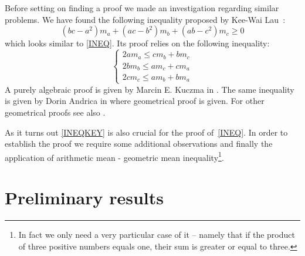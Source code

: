 \documentclass[a4paper,12pt]{article}
\begin{document}
Before setting on finding a proof we made an investigation regarding similar problems. We have found the following inequality proposed by Kee-Wai Lau~\cite{Crux}:
\begin{equation}\label{INEQS}
\left({bc}-a^2\right) m_a+ \left({ac}-b^2\right)m_b+\left({ab}-c^2\right)m_c \geq 0
\end{equation}
which looks similar to \eqref{INEQ}. Its proof relies on the following inequality:
\begin{equation}\label{INEQKEY}
\begin{cases}
2a m_a \leq c m_b+b m_c\\
2b m_b \leq a m_c+c m_a\\
2c m_c \leq a m_b+b m_a
\end{cases}
\end{equation}
A purely algebraic proof is given by Marcin E. Kuczma in \cite{Cruxsol}. The same inequality is given by Dorin Andrica in \cite{MathematicalReflections} where geometrical proof is  given. For other geometrical proofs see also \cite{cuttheknot}. 

As it turns out \eqref{INEQKEY} is also crucial for the proof of~\eqref{INEQ}. In order to establish the proof we require some additional observations and finally the application of arithmetic mean - geometric mean inequality\footnote{In fact we only need a very particular case of it -- namely that if the product of three positive numbers equals one, their sum is greater or equal to three.}.

\section{Preliminary results}
\end{document}
